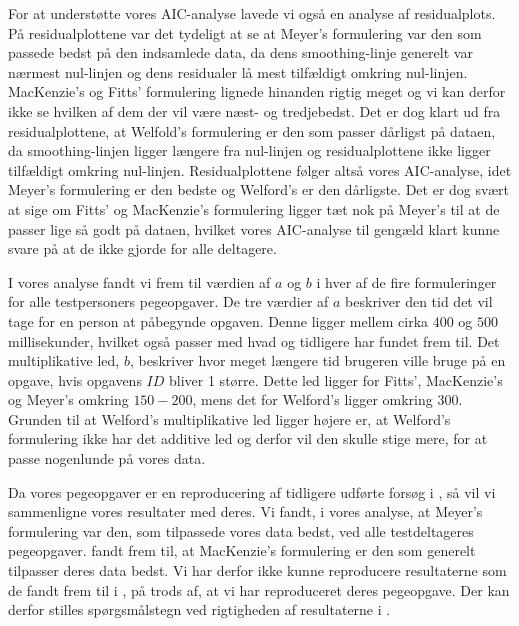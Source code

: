 For at understøtte vores AIC-analyse lavede vi også en analyse af residualplots. På residualplottene var det tydeligt at se at Meyer's formulering var den som passede bedst på den indsamlede data, da dens smoothing-linje generelt var nærmest nul-linjen og dens residualer lå mest tilfældigt omkring nul-linjen. MacKenzie's og Fitts' formulering lignede hinanden rigtig meget og vi kan derfor ikke se hvilken af dem der vil være næst- og tredjebedst. Det er dog klart ud fra residualplottene, at Welfold's formulering er den som passer dårligst på dataen, da smoothing-linjen ligger længere fra nul-linjen og residualplottene ikke ligger tilfældigt omkring nul-linjen. Residualplottene følger altså vores AIC-analyse, idet Meyer's formulering er den bedste og Welford's er den dårligste. Det er dog svært at sige om Fitts' og MacKenzie's formulering ligger tæt nok på Meyer's til at de passer lige så godt på dataen, hvilket vores AIC-analyse til gengæld klart kunne svare på at de ikke gjorde for alle deltagere.

I vores analyse fandt vi frem til værdien af $a$ og $b$ i hver af de fire formuleringer for alle testpersoners pegeopgaver. De tre værdier af $a$ beskriver den tid det vil tage for en person at påbegynde opgaven. Denne ligger mellem cirka $400$ og $500$ millisekunder, hvilket også passer med hvad \cite{crossman1957} og \cite{welford1968} tidligere har fundet frem til. Det multiplikative led, $b$, beskriver hvor meget længere tid brugeren ville bruge på en opgave, hvis opgavens $ID$ bliver 1 større. Dette led ligger for Fitts', MacKenzie's og Meyer's omkring $150-200$, mens det for Welford's ligger omkring $300$. Grunden til at Welford's multiplikative led ligger højere er, at Welford's formulering ikke har det additive led og derfor vil den skulle stige mere, for at passe nogenlunde på vores data.

Da vores pegeopgaver er en reproducering af tidligere udførte forsøg i \cite{goldberg2015}, så vil vi sammenligne vores resultater med deres. Vi fandt, i vores analyse, at Meyer's formulering var den, som tilpassede vores data bedst, ved alle testdeltageres pegeopgaver. \cite{goldberg2015} fandt frem til, at MacKenzie's formulering er den som generelt tilpasser deres data bedst. Vi har derfor ikke kunne reproducere resultaterne som de fandt frem til i \cite{goldberg2015}, på trods af, at vi har reproduceret deres pegeopgave. Der kan derfor stilles spørgsmålstegn ved rigtigheden af resultaterne i \cite{goldberg2015}.

